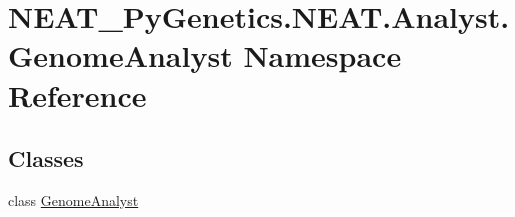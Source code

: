 \hypertarget{namespaceNEAT__PyGenetics_1_1NEAT_1_1Analyst_1_1GenomeAnalyst}{}\section{N\+E\+A\+T\+\_\+\+Py\+Genetics.\+N\+E\+A\+T.\+Analyst.\+Genome\+Analyst Namespace Reference}
\label{namespaceNEAT__PyGenetics_1_1NEAT_1_1Analyst_1_1GenomeAnalyst}
\subsection*{Classes}
\begin{DoxyCompactItemize}
\item 
class \hyperlink{classNEAT__PyGenetics_1_1NEAT_1_1Analyst_1_1GenomeAnalyst_1_1GenomeAnalyst}{Genome\+Analyst}
\end{DoxyCompactItemize}
